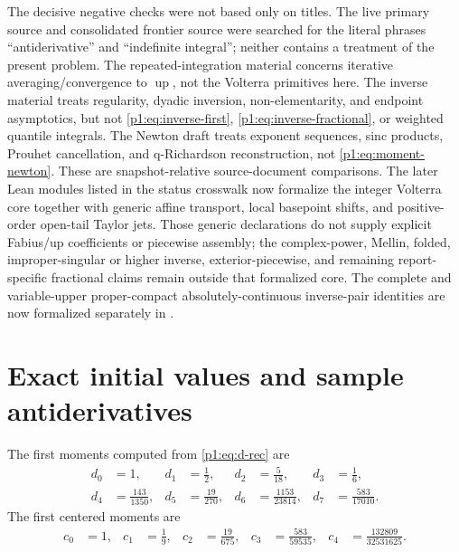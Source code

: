 \documentclass[11pt,oneside]{article}
\theoremstyle{definition}
\theoremstyle{remark}
\newcommand{\Up}{\operatorname{up}}
\newcommand{\1}{\mathbf 1}
\begin{document}
The decisive negative checks were not based only on titles.  The live primary
source and consolidated frontier source were searched for the literal phrases
``antiderivative'' and ``indefinite integral''; neither contains a treatment of
the present problem.  The repeated-integration material concerns iterative
averaging/convergence to \(\Up\), not the Volterra primitives here.  The
inverse material treats regularity, dyadic inversion, non-elementarity, and
endpoint asymptotics, but not \eqref{p1:eq:inverse-first},
\eqref{p1:eq:inverse-fractional}, or weighted quantile integrals.  The Newton draft
treats exponent sequences, sinc products, Prouhet cancellation, and
q-Richardson reconstruction, not \eqref{p1:eq:moment-newton}.  These are
snapshot-relative source-document comparisons.  The later Lean modules listed
in the status crosswalk now formalize the integer Volterra core together with
generic affine transport, local basepoint shifts, and positive-order open-tail
Taylor jets.  Those generic declarations do not supply explicit Fabius/up
coefficients or piecewise assembly; the complex-power, Mellin, folded, improper-singular
or higher inverse, exterior-piecewise, and remaining report-specific fractional claims
remain outside that formalized core.  The complete and variable-upper proper-compact
absolutely-continuous inverse-pair identities are now formalized separately in
.

\section{Exact initial values and sample antiderivatives}

The first moments computed from \eqref{p1:eq:d-rec} are
\begin{align*}
 d_0&=1,&
 d_1&=\frac12,&
 d_2&=\frac5{18},&
 d_3&=\frac16,\\
 d_4&=\frac{143}{1350},&
 d_5&=\frac{19}{270},&
 d_6&=\frac{1153}{23814},&
 d_7&=\frac{583}{17010}.
\end{align*}
The first centered moments are
\begin{align*}
 c_0&=1,&
 c_1&=\frac19,&
 c_2&=\frac{19}{675},&
 c_3&=\frac{583}{59535},&
 c_4&=\frac{132809}{32531625}.
\end{align*}
\end{document}
